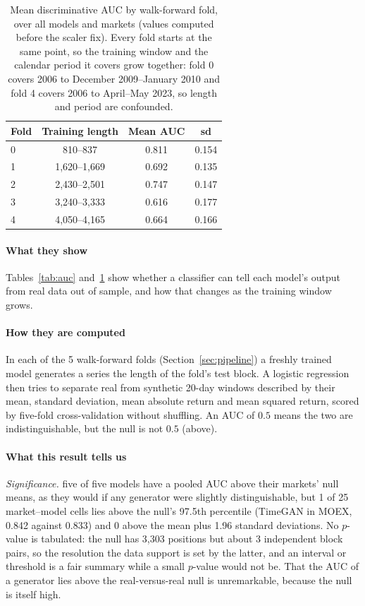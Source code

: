 \documentclass[11pt,a4paper]{article}
\makeatletter
\DeclareRobustCommand{\_}{\ifmmode\nfss@text{\textunderscore}\else\textunderscore\allowbreak\fi}
\makeatother
\begin{document}
\begin{table}[htbp]
\centering
\caption{Mean discriminative AUC by walk-forward fold, over all models and markets (values computed before the scaler fix). Every fold starts at the same point, so the training window and the calendar period it covers grow together: fold 0 covers 2006 to December 2009--January 2010 and fold 4 covers 2006 to April--May 2023, so length and period are confounded.}
\label{tab:folds}
\begin{tabular}{@{}lccc@{}}
\toprule
Fold & Training length & Mean AUC & sd \\
\midrule
0 & 810--837 & 0.811 & 0.154 \\
1 & 1,620--1,669 & 0.692 & 0.135 \\
2 & 2,430--2,501 & 0.747 & 0.147 \\
3 & 3,240--3,333 & 0.616 & 0.177 \\
4 & 4,050--4,165 & 0.664 & 0.166 \\
\bottomrule
\end{tabular}
\end{table}

\paragraph{What they show} Tables~\ref{tab:auc} and~\ref{tab:folds} show whether a classifier can tell each model's output from real data out of sample, and how that changes as the training window grows.

\paragraph{How they are computed} In each of the 5 walk-forward folds (Section~\ref{sec:pipeline}) a freshly trained model generates a series the length of the fold's test block. A logistic regression then tries to separate real from synthetic 20-day windows described by their mean, standard deviation, mean absolute return and mean squared return, scored by five-fold cross-validation without shuffling. An AUC of $0.5$ means the two are indistinguishable, but the null is not $0.5$ (above).

\paragraph{What this result tells us} \emph{Significance.} five of five models have a pooled AUC above their markets' null means, as they would if any generator were slightly distinguishable, but 1 of 25 market--model cells lies above the null's 97.5th percentile (TimeGAN in MOEX, 0.842 against 0.833) and 0 above the mean plus 1.96 standard deviations. No $p$-value is tabulated: the null has 3{,}303 positions but about 3 independent block pairs, so the resolution the data support is set by the latter, and an interval or threshold is a fair summary while a small $p$-value would not be. That the AUC of a generator lies above the real-versus-real null is unremarkable, because the null is itself high.
\end{document}
